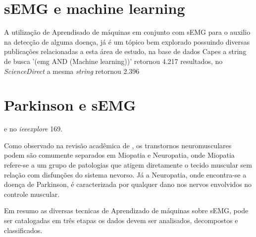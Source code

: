 \section{sEMG e machine learning}
A utilização de Aprendisado de máquinas em conjunto com sEMG para o auxilio na detecção de alguma doença, já é um tópico bem explorado possuindo diversas publicações relacionadas a esta área de estudo, na base de dados Capes a string de busca '(emg AND (Machine learning))' retornou 4.217 resultados, no \textit{ScienceDirect} a mesma \textit{string} retornou 2.396 \section{Parkinson e sEMG} e no \textit{ieeexplore} 169.

Como observado na revisão acadêmica de \cite{yousefi2014characterizing}, os transtornos neuromusculares podem são comumente separados em Miopatia e Neuropatia, onde Miopatia refere-se a um grupo de patologias que atigem diretamente o tecido muscular sem relação com disfunções do sistema nevorso. Já a Neuropatia, onde encontra-se a doença de Parkinson, é caracterizada por qualquer dano nos nervos envolvidos no controle muscular.

Em resumo as diversas tecnicas de Aprendizado de máquinas sobre sEMG, pode ser catalogadas em três etapas os dados devem ser analisados, decompostos e classificados\cite{yousefi2014characterizing}.

